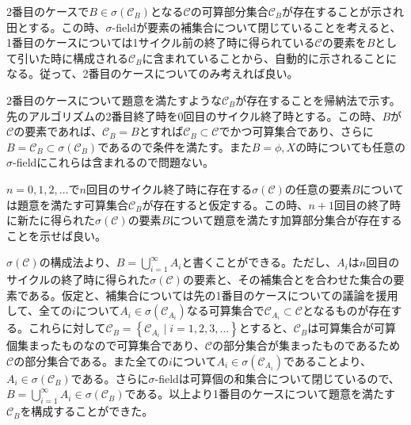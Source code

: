 \documentclass{article}
\begin{document}
2番目のケースで$B \in \sigma(\mathcal{C}_B)$となる$\mathcal{C}$の可算部分集合$\mathcal{C}_B$が存在することが示され田とする。この時、$\sigma$-fieldが要素の補集合について閉じていることを考えると、1番目のケースについては1サイクル前の終了時に得られている$\mathcal{C}$の要素を$B$として引いた時に構成される$\mathcal{C}_B$に含まれていることから、自動的に示されることになる。従って、2番目のケースについてのみ考えれば良い。

2番目のケースについて題意を満たすような$\mathcal{C}_B$が存在することを帰納法で示す。先のアルゴリズムの2番目終了時を0回目のサイクル終了時とする。この時、$B$が$\mathcal{C}$の要素であれば、$\mathcal{C}_B = B$とすれば$\mathcal{C}_B \subset \mathcal{C}$でかつ可算集合であり、さらに$B = \mathcal{C}_B \subset \sigma(\mathcal{C}_B)$であるので条件を満たす。また$B = \phi,X$の時についても任意の$\sigma$-fieldにこれらは含まれるので問題ない。

$n = 0,1,2,\dots$で$n$回目のサイクル終了時に存在する$\sigma(\mathcal{C})$の任意の要素$B$については題意を満たす可算集合$\mathcal{C}_B$が存在すると仮定する。この時、$n+1$回目の終了時に新たに得られた$\sigma(\mathcal{C})$の要素$B$について題意を満たす加算部分集合が存在することを示せば良い。

$\sigma(\mathcal{C})$の構成法より、$B = \bigcup_{i = 1}^{\infty} A_i$と書くことができる。ただし、$A_i$は$n$回目のサイクルの終了時に得られた$\sigma(\mathcal{C})$の要素と、その補集合とを合わせた集合の要素である。仮定と、補集合については先の1番目のケースについての議論を援用して、全ての$i$について$A_i \in \sigma(\mathcal{C}_{A_i})$なる可算集合で$\mathcal{C}_{A_i} \subset \mathcal{C}$となるものが存在する。これらに対して$\mathcal{C}_B = \left\{ \mathcal{C}_{A_i} \mid i = 1,2,3,\dots \right\}$とすると、$\mathcal{C}_B$は可算集合が可算個集まったものなので可算集合であり、$\mathcal{C}$の部分集合が集まったものであるため$\mathcal{C}$の部分集合である。また全ての$i$について$A_i \in \sigma(\mathcal{C}_{A_i})$であることより、$A_i \in \sigma(\mathcal{C}_B)$である。さらに$\sigma$-fieldは可算個の和集合について閉じているので、$B = \bigcup_{i = 1}^{\infty} A_i \in \sigma(\mathcal{C}_B)$である。以上より1番目のケースについて題意を満たす$\mathcal{C}_B$を構成することができた。
\end{document}
